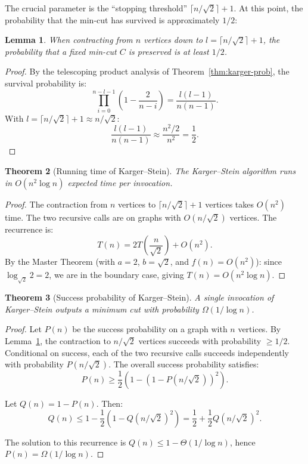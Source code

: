 \documentclass[twoside,12pt]{book}
\theoremstyle{plain}
\newtheorem{theorem}{Theorem}[chapter]
\newtheorem{lemma}[theorem]{Lemma}
\theoremstyle{definition}
\theoremstyle{remark}
\begin{document}
The crucial parameter is the ``stopping threshold'' $\lceil n / \sqrt{2} \rceil + 1$. At this point, the probability that the min-cut has survived is approximately $1/2$:

\begin{lemma}
\label{lem:ks-half}
When contracting from $n$ vertices down to $l = \lceil n / \sqrt{2} \rceil + 1$, the probability that a fixed min-cut $C$ is preserved is at least $1/2$.
\end{lemma}

\begin{proof}
By the telescoping product analysis of Theorem~\ref{thm:karger-prob}, the survival probability is:
\[
\prod_{i=0}^{n-l-1} \left(1 - \frac{2}{n - i}\right) = \frac{l(l-1)}{n(n-1)}.
\]
With $l = \lceil n/\sqrt{2} \rceil + 1 \approx n/\sqrt{2}$:
\[
\frac{l(l-1)}{n(n-1)} \approx \frac{n^2/2}{n^2} = \frac{1}{2}.
\]
\end{proof}

\begin{theorem}[Running time of Karger--Stein]
\label{thm:karger-stein-time}
The Karger--Stein algorithm runs in $O(n^2 \log n)$ expected time per invocation.
\end{theorem}

\begin{proof}
The contraction from $n$ vertices to $\lceil n/\sqrt{2} \rceil + 1$ vertices takes $O(n^2)$ time. The two recursive calls are on graphs with $O(n/\sqrt{2})$ vertices. The recurrence is:
\[
T(n) = 2T\!\left(\frac{n}{\sqrt{2}}\right) + O(n^2).
\]
By the Master Theorem (with $a = 2$, $b = \sqrt{2}$, and $f(n) = O(n^2)$): since $\log_{\sqrt{2}} 2 = 2$, we are in the boundary case, giving $T(n) = O(n^2 \log n)$.
\end{proof}

\begin{theorem}[Success probability of Karger--Stein]
\label{thm:ks-prob}
A single invocation of Karger--Stein outputs a minimum cut with probability $\Omega(1 / \log n)$.
\end{theorem}

\begin{proof}
Let $P(n)$ be the success probability on a graph with $n$ vertices. By Lemma~\ref{lem:ks-half}, the contraction to $n/\sqrt{2}$ vertices succeeds with probability $\geq 1/2$. Conditional on success, each of the two recursive calls succeeds independently with probability $P(n/\sqrt{2})$. The overall success probability satisfies:
\[
P(n) \geq \frac{1}{2} \left(1 - (1 - P(n/\sqrt{2}))^2\right).
\]

Let $Q(n) = 1 - P(n)$. Then:
\[
Q(n) \leq 1 - \frac{1}{2}(1 - Q(n/\sqrt{2})^2) = \frac{1}{2} + \frac{1}{2}Q(n/\sqrt{2})^2.
\]

The solution to this recurrence is $Q(n) \leq 1 - \Theta(1/\log n)$, hence $P(n) = \Omega(1/\log n)$.
\end{proof}
\end{document}
